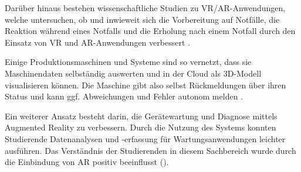 Darüber hinaus bestehen wissenschaftliche Studien zu VR/AR-Anwendungen, welche untersuchen, ob und inwieweit sich die Vorbereitung auf Notfälle, die Reaktion während eines Notfalls und die Erholung nach einem Notfall durch den Einsatz von VR und AR-Anwendungen verbessert \autocite{VRandAR}. 

Einige Produktionsmaschinen und Systeme sind so vernetzt, dass sie Maschinendaten selbständig auswerten und in der Cloud als 3D-Modell visualisieren können. Die Maschine gibt also selbst Rückmeldungen über ihren Status und kann ggf. Abweichungen und Fehler autonom melden \autocite{Mascienenausf_entdecken}.

Ein weiterer Ansatz besteht darin, die Gerätewartung und Diagnose mittels Augmented Reality zu verbessern. Durch die Nutzung des Systems konnten Studierende Datenanalysen und -erfassung für Wartungsanwendungen leichter ausführen. Das Verständnis der Studierenden in diesem Sachbereich wurde durch die Einbindung von AR positiv beeinflusst (\cite{Develop_and_Asses_AR}). 

\newpage




\newpage







